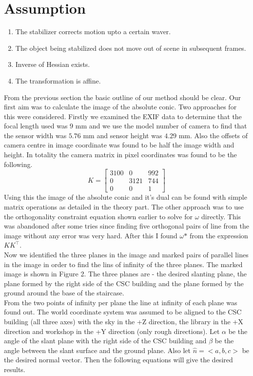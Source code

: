 \documentclass[12pt]{article}
\begin{document}
\section{Assumption}
\begin{enumerate}
    \item The stabilizer corrects motion upto a certain waver.  
    \item The object being stabilized does not move out of scene in subsequent frames.
    \item Inverse of Hessian exists.
    \item The transformation is affine.    
\end{enumerate}



From the previous section the basic outline of our method should be clear. Our first aim was to calculate the image of the absolute conic. Two approaches for this were considered. Firstly we examined the EXIF data to determine that the focal length used was $9$ mm and we use the model number of camera to find that the sensor width was $5.76$ mm and sensor height was $4.29$ mm. Also the offsets of camera centre in image coordinate was found to be half the image width and height. In totality the camera matrix in pixel coordinates was found to be the following.
$$ K=  \begin{bmatrix}3100 &0&992\\0 & 3121&744\\0 & 0 & 1 \end{bmatrix} $$
Using this the image of the absolute conic and it's dual can be found with simple matrix operations as detailed in the theory part. The other approach was to use the orthogonality constraint equation shown earlier to solve for $\omega$ directly. This was abandoned after some tries since finding five orthogonal pairs of line from the image without any error was very hard. After this I found $\omega \mbox{*}$ from the expression $K K^\top$. \\
Now we identified the three planes in the image and marked pairs of parallel lines in the image in order to find the lins of infinity of the three planes. The marked image is shown in Figure 2. The three planes are - the desired slanting plane, the plane formed by the right side of the CSC building and the plane formed by the ground around the base of the staircase.\\
From the two points of infinity per plane the line at infinity of each plane was found out. The world coordinate system was assumed to be aligned to the CSC building (all three axes) with the sky in the +Z direction, the library in the +X direction and workshop in the +Y direction (only rough directions). Let $\alpha$ be the angle of the slant plane with the right side of the CSC building and $\beta$ be the angle between the slant surface and the ground plane. Also let $\hat{n} = <a,b,c>$ be the desired normal vector. Then the following equations will give the desired results.
\end{document}
